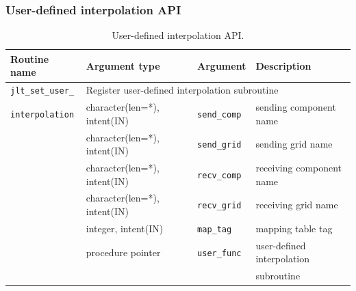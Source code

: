 \documentclass[11pt,a4paper]{report}
\begin{document}
\subsubsection{User-defined interpolation API}

\begin{table}[H]
\begin{center}
\caption{User-defined interpolation API.}
{\small
\label{table:jlt_api_user_intpl}
\begin{tabular}{llll}
\hline\hline
Routine name & Argument type & Argument & Description \\
\hline
 \texttt{jlt\_set\_user\_} & \multicolumn{3}{l}{Register user-defined
   interpolation subroutine} \\
 \texttt{interpolation}
   & character(len=*), intent(IN)
     & \texttt{send\_comp} & sending component name\\
   & character(len=*), intent(IN)
     & \texttt{send\_grid} & sending grid name\\
   & character(len=*), intent(IN)
     & \texttt{recv\_comp} & receiving component name\\
   & character(len=*), intent(IN)
     & \texttt{recv\_grid} & receiving grid name\\
   & integer, intent(IN)
     & \texttt{map\_tag} & mapping table tag\\
   & procedure pointer
     & \texttt{user\_func} & user-defined interpolation\\
   &
     & & subroutine\\
\hline\hline
\end{tabular}
}
\end{center}
\end{table}


%

\renewcommand{\chaptermark}[1]{%
\markboth{\appendixname \thechapter #1}{}}
\renewcommand{\sectionmark}[1]{%
\markright{\thesection\ #1 }}

\cleardoublepage

\pagestyle{empty}
\setcounter{page}{1}
\appendix




\listoffigures
\listoftables
\lstlistoflistings
\end{document}
